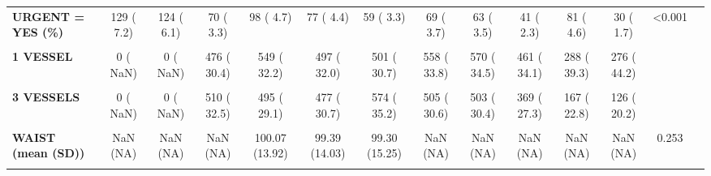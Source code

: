 \documentclass[
]{article}
\begin{document}
\begin{table}[H]
\begin{tabular}[t]{>{\raggedright\arraybackslash}p{5em}ccccccccccccc}
\textbf{URGENT = YES (\%)} & 129 (  7.2) & 124 (  6.1) & 70 (  3.3) & 98 (  4.7) & 77 (  4.4) & 59 (  3.3) & 69 (  3.7) & 63 (  3.5) & 41 (  2.3) & 81 (  4.6) & 30 (  1.7) & <0.001 & \\
\textbf{\cellcolor{gray!10}{VESSEL (\%)}} & \cellcolor{gray!10}{} & \cellcolor{gray!10}{} & \cellcolor{gray!10}{} & \cellcolor{gray!10}{} & \cellcolor{gray!10}{} & \cellcolor{gray!10}{} & \cellcolor{gray!10}{} & \cellcolor{gray!10}{} & \cellcolor{gray!10}{} & \cellcolor{gray!10}{} & \cellcolor{gray!10}{} & \cellcolor{gray!10}{NaN} & \cellcolor{gray!10}{}\\
\textbf{1 VESSEL} & 0 (  NaN) & 0 (  NaN) & 476 ( 30.4) & 549 ( 32.2) & 497 ( 32.0) & 501 ( 30.7) & 558 ( 33.8) & 570 ( 34.5) & 461 ( 34.1) & 288 ( 39.3) & 276 ( 44.2) &  & \\
\textbf{\cellcolor{gray!10}{2 VESSELS}} & \cellcolor{gray!10}{0 (  NaN)} & \cellcolor{gray!10}{0 (  NaN)} & \cellcolor{gray!10}{515 ( 32.8)} & \cellcolor{gray!10}{591 ( 34.7)} & \cellcolor{gray!10}{503 ( 32.4)} & \cellcolor{gray!10}{495 ( 30.3)} & \cellcolor{gray!10}{503 ( 30.4)} & \cellcolor{gray!10}{499 ( 30.2)} & \cellcolor{gray!10}{416 ( 30.8)} & \cellcolor{gray!10}{244 ( 33.3)} & \cellcolor{gray!10}{215 ( 34.4)} & \cellcolor{gray!10}{} & \cellcolor{gray!10}{}\\
\textbf{3 VESSELS} & 0 (  NaN) & 0 (  NaN) & 510 ( 32.5) & 495 ( 29.1) & 477 ( 30.7) & 574 ( 35.2) & 505 ( 30.6) & 503 ( 30.4) & 369 ( 27.3) & 167 ( 22.8) & 126 ( 20.2) &  & \\
\textbf{\cellcolor{gray!10}{NONE}} & \cellcolor{gray!10}{0 (  NaN)} & \cellcolor{gray!10}{0 (  NaN)} & \cellcolor{gray!10}{67 (  4.3)} & \cellcolor{gray!10}{68 (  4.0)} & \cellcolor{gray!10}{75 (  4.8)} & \cellcolor{gray!10}{61 (  3.7)} & \cellcolor{gray!10}{87 (  5.3)} & \cellcolor{gray!10}{81 (  4.9)} & \cellcolor{gray!10}{104 (  7.7)} & \cellcolor{gray!10}{34 (  4.6)} & \cellcolor{gray!10}{8 (  1.3)} & \cellcolor{gray!10}{} & \cellcolor{gray!10}{}\\
\textbf{WAIST (mean (SD))} & NaN (NA) & NaN (NA) & NaN (NA) & 100.07 (13.92) & 99.39 (14.03) & 99.30 (15.25) & NaN (NA) & NaN (NA) & NaN (NA) & NaN (NA) & NaN (NA) & 0.253 & \\
\textbf{\cellcolor{gray!10}{WARD1 (\%)}} & \cellcolor{gray!10}{} & \cellcolor{gray!10}{} & \cellcolor{gray!10}{} & \cellcolor{gray!10}{} & \cellcolor{gray!10}{} & \cellcolor{gray!10}{} & \cellcolor{gray!10}{} & \cellcolor{gray!10}{} & \cellcolor{gray!10}{} & \cellcolor{gray!10}{} & \cellcolor{gray!10}{} & \cellcolor{gray!10}{<0.001} & \cellcolor{gray!10}{}\\

\end{tabular}
\end{table}
\end{document}
